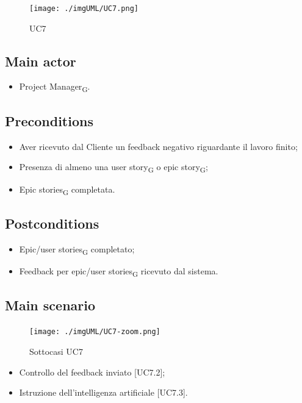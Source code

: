 \documentclass{article}
\begin{document}
\begin{figure}[h]
      \centering
      \texttt{[image: ./imgUML/UC7.png]}
        \caption{UC7}
      \label{fig:UC7}
    \end{figure}
    
    \subsection*{Main actor}
    \begin{itemize}
        \item Project Manager\textsubscript{G}.
    \end{itemize}
    
    \subsection*{Preconditions}
    \begin{itemize}
        \item Aver ricevuto dal Cliente un feedback negativo riguardante il lavoro finito;
        \item Presenza di almeno una user story\textsubscript{G}  o epic story\textsubscript{G};
        \item Epic stories\textsubscript{G}  completata.
    \end{itemize}
    
    \subsection*{Postconditions}
    \begin{itemize}
        \item Epic/user stories\textsubscript{G}  completato;
        \item Feedback per epic/user stories\textsubscript{G}  ricevuto dal sistema.
    \end{itemize}
    
    \subsection*{Main scenario}
        \begin{figure}[h]
            \centering
            \texttt{[image: ./imgUML/UC7-zoom.png]}
            \caption{Sottocasi UC7}
            \label{fig:UC7_sottocasi}
        \end{figure}
        \begin{itemize}
            \item Controllo del feedback inviato [UC7.2];
            \item Istruzione dell'intelligenza artificiale [UC7.3].
        \end{itemize}
        
\end{document}
